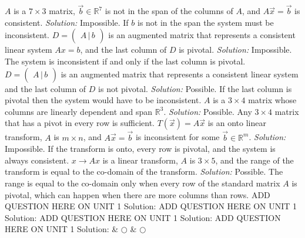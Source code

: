 \fi      
\ifnum {}
     $A$ is a $7\times3$ matrix, $\vec b \in \mathbb R^{7}$ is not in the span of the columns of $A$, and $A\vec x = \vec b$ is consistent.
    \ifnum {} {\color{DarkBlue} \textit{Solution:  } Impossible. If $b$ is not in the span the system must be inconsistent. }  \fi
\fi      
\ifnum {}
  \setlength{\extrarowheight}{0.00cm} $D = \begin{pmatrix} A \, | \, b\end{pmatrix}$ is an augmented matrix that represents a consistent linear system $Ax=b$, and the last column  of $D$ is pivotal. 
    \ifnum {} {\color{DarkBlue} \textit{Solution:  } Impossible. The system is inconsistent if and only if the last column is pivotal.  }\fi
\fi      
\ifnum {}
    \setlength{\extrarowheight}{0.00cm} \setlength{\extrarowheight}{0.00cm} $D = \begin{pmatrix} A \, | \, b\end{pmatrix}$ is an augmented matrix that represents a consistent linear system and the last column of $D$ is not pivotal. 
    \ifnum {} {\color{DarkBlue} \textit{Solution:  } Possible. If the last column is pivotal then the system would have to be inconsistent.  } \fi
\fi      
\ifnum {}
     $A$ is a $3\times 4$ matrix whose columns are linearly dependent and span $\mathbb R^3$.
    \ifnum {} {\color{DarkBlue} \textit{Solution:  } Possible. Any $3\times4$ matrix that has a pivot in every row is sufficient. } \fi
\fi    
\ifnum {} 
    $T(\vec x) = A\vec x$ is an onto linear transform, $A$ is $m\times n$, and $A\vec x = \vec b$ is inconsistent for some $\vec b \in \mathbb R^m$.
    \ifnum {} {\color{DarkBlue} \textit{Solution:  } Impossible. If the transform is onto, every row is pivotal, and the system is always consistent.  } \fi
\fi    
\ifnum {} %
    $x\to Ax$ is a linear transform, $A$ is $3\times5$, and the range of the transform is equal to the co-domain of the transform. 
    \ifnum {} {\color{DarkBlue} \textit{Solution:  } Possible. The range is equal to the co-domain only when every row of the standard matrix $A$ is pivotal, which can happen when there are more columns than rows.  } \fi
\fi    
\ifnum {} %
    \setlength{\extrarowheight}{0.00cm} ADD QUESTION HERE ON UNIT 1
    \ifnum {} {\color{DarkBlue} Solution:  
    } \fi
\fi    
\ifnum {} %
    \setlength{\extrarowheight}{0.00cm} ADD QUESTION HERE ON UNIT 1
    \ifnum {} {\color{DarkBlue} Solution:  
    } \fi
\fi    
\ifnum {} %
    \setlength{\extrarowheight}{0.00cm} ADD QUESTION HERE ON UNIT 1
    \ifnum {} {\color{DarkBlue} Solution:  
    } \fi
\fi    
\ifnum {} %
    \setlength{\extrarowheight}{0.00cm} ADD QUESTION HERE ON UNIT 1
    \ifnum {} {\color{DarkBlue} Solution:  
    } \fi
\fi    
& $\bigcirc$  & $\bigcirc$ \\     